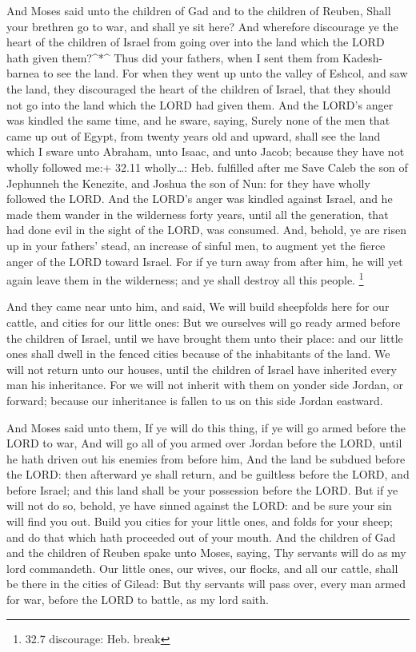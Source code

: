  And Moses said unto the children of Gad and to the children
of Reuben, Shall your brethren go to war, and shall ye sit here?
 And wherefore discourage ye the heart of the children of
Israel from going over into the land which the LORD hath given
them?\^{}*\^{}  Thus did your fathers, when I sent them from
Kadesh-barnea to see the land.  For when they went up unto
the valley of Eshcol, and saw the land, they discouraged the heart of
the children of Israel, that they should not go into the land which the
LORD had given them.  And the LORD's anger was kindled the
same time, and he sware, saying,  Surely none of the men
that came up out of Egypt, from twenty years old and upward, shall see
the land which I sware unto Abraham, unto Isaac, and unto Jacob; because
they have not wholly followed me:+ 32.11 wholly\ldots: Heb. fulfilled
after me  Save Caleb the son of Jephunneh the Kenezite, and
Joshua the son of Nun: for they have wholly followed the LORD.
 And the LORD's anger was kindled against Israel, and he
made them wander in the wilderness forty years, until all the
generation, that had done evil in the sight of the LORD, was consumed.
 And, behold, ye are risen up in your fathers' stead, an
increase of sinful men, to augment yet the fierce anger of the LORD
toward Israel.  For if ye turn away from after him, he will
yet again leave them in the wilderness; and ye shall destroy all this
people. \footnote{32.7 discourage: Heb. break}

 And they came near unto him, and said, We will build
sheepfolds here for our cattle, and cities for our little ones:
 But we ourselves will go ready armed before the children
of Israel, until we have brought them unto their place: and our little
ones shall dwell in the fenced cities because of the inhabitants of the
land.  We will not return unto our houses, until the
children of Israel have inherited every man his inheritance.
 For we will not inherit with them on yonder side Jordan,
or forward; because our inheritance is fallen to us on this side Jordan
eastward.

 And Moses said unto them, If ye will do this thing, if ye
will go armed before the LORD to war,  And will go all of
you armed over Jordan before the LORD, until he hath driven out his
enemies from before him,  And the land be subdued before
the LORD: then afterward ye shall return, and be guiltless before the
LORD, and before Israel; and this land shall be your possession before
the LORD.  But if ye will not do so, behold, ye have sinned
against the LORD: and be sure your sin will find you out. 
Build you cities for your little ones, and folds for your sheep; and do
that which hath proceeded out of your mouth.  And the
children of Gad and the children of Reuben spake unto Moses, saying, Thy
servants will do as my lord commandeth.  Our little ones,
our wives, our flocks, and all our cattle, shall be there in the cities
of Gilead:  But thy servants will pass over, every man
armed for war, before the LORD to battle, as my lord saith.

